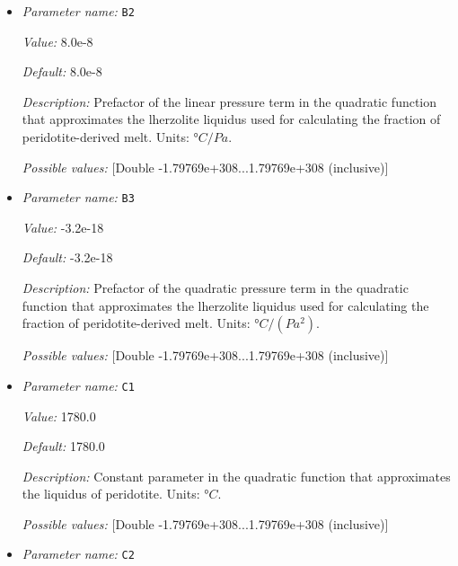 \begin{itemize}
{\it Default:} 1475.0


{\it Description:} Constant parameter in the quadratic function that approximates the lherzolite liquidus used for calculating the fraction of peridotite-derived melt. Units: $°C$.


{\it Possible values:} [Double -1.79769e+308...1.79769e+308 (inclusive)]
\item {\it Parameter name:} {\tt B2}
\label{parameters:Material model/Latent heat melt/B2}


{\it Value:} 8.0e-8


{\it Default:} 8.0e-8


{\it Description:} Prefactor of the linear pressure term in the quadratic function that approximates the  lherzolite liquidus used for calculating the fraction of peridotite-derived melt. Units: $°C/Pa$.


{\it Possible values:} [Double -1.79769e+308...1.79769e+308 (inclusive)]
\item {\it Parameter name:} {\tt B3}
\label{parameters:Material model/Latent heat melt/B3}


{\it Value:} -3.2e-18


{\it Default:} -3.2e-18


{\it Description:} Prefactor of the quadratic pressure term in the quadratic function that approximates the  lherzolite liquidus used for calculating the fraction of peridotite-derived melt. Units: $°C/(Pa^2)$.


{\it Possible values:} [Double -1.79769e+308...1.79769e+308 (inclusive)]
\item {\it Parameter name:} {\tt C1}
\label{parameters:Material model/Latent heat melt/C1}


{\it Value:} 1780.0


{\it Default:} 1780.0


{\it Description:} Constant parameter in the quadratic function that approximates the liquidus of peridotite. Units: $°C$.


{\it Possible values:} [Double -1.79769e+308...1.79769e+308 (inclusive)]
\item {\it Parameter name:} {\tt C2}
\label{parameters:Material model/Latent heat melt/C2}



\end{itemize}
